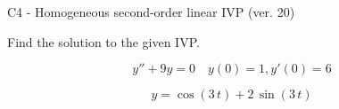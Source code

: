 \begin{exercise}
  \begin{exerciseTitle}C4 - Homogeneous second-order linear IVP (ver. 20)\end{exerciseTitle}
  \begin{exerciseStatement}
    
Find the solution to the given IVP.

    
\[y''+9y = 0 \hspace{1em} y(0) = 1 , y'(0) = 6\]

  \end{exerciseStatement}
  \begin{exerciseAnswer}
    
\[y= \cos\left(3 \, t\right) + 2 \, \sin\left(3 \, t\right)\]

  \end{exerciseAnswer}
\end{exercise}